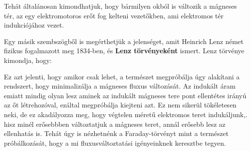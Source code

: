 \documentclass[a4paper,12pt]{article}
\begin{document}
Tehát általánosan kimondhatjuk, hogy bármilyen okból is változik a mágneses tér, az egy elektromotoros erőt fog kelteni vezetőkben, ami elektromos tér indukciójához vezet.

Egy másik szembszögből is megérthetjük a jelenséget, amit Heinrich Lenz német fizikus fogalmazott meg 1834-ben, és \textbf{Lenz törvényeként} ismert. Lenz törvénye kimondja, hogy:
\begin{quote}
\end{quote}
Ez azt jelenti, hogy amikor csak lehet, a természet megpróbálja úgy alakítani a rendszert, hogy minimalizálja a mágneses fluxus változását. Az indukált áram emiatt mindig olyan lesz aminek az indukált mágneses tere pont ellentétes irányú az őt létrehozóval, ezáltal megpróbálja kiejteni azt. 
Ez nem sikerül tökéletesen neki, de ez akadályozza meg, hogy végtelen méretű elektromos teret indukáljunk,. hisz minél erősebbben változtatjuk a mágneses teret, annál erősebb lesz az ellenhatás is. Tehát úgy is nézhetnénk a Faraday-törvényt mint a természet próbálkozását, hogy a mi fluxusváltoztatási igényeinknek keresztbe tegyen.
\end{document}
